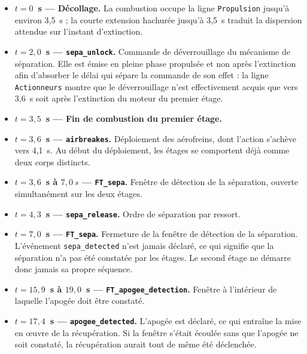 \begin{itemize}
    \item \textbf{$t = 0$~s — Décollage.} La combustion occupe la ligne \texttt{Propulsion} jusqu'à environ 3,5~s ; la courte
    extension hachurée jusqu'à 3,5~s traduit la dispersion attendue sur l'instant d'extinction.\\

    \item \textbf{$t = 2{,}0$~s — \texttt{sepa\_unlock}.} Commande de déverrouillage du mécanisme de séparation. Elle est
    émise en pleine phase propulsée et non après l'extinction afin d'absorber le délai qui sépare la commande de son effet : la
    ligne \texttt{Actionneurs} montre que le déverrouillage n'est effectivement acquis que vers 3,6~s soit après l'extinction du
    moteur du premier étage.\\

    \item \textbf{$t = 3{,}5$~s — Fin de combustion du premier étage.}\\

    \item \textbf{$t = 3{,}6$~s — \texttt{airbreakes}.} Déploiement des aérofreins, dont l'action s'achève vers 4,1~s. Au
    début du déploiement, les étages se comportent déjà comme deux corps distincts.\\  

    \item \textbf{$t = 3{,}6$~s à $7,0~s$ — \texttt{FT\_sepa}.} Fenêtre de détection de la séparation, ouverte simultanément
    sur les deux étages.\\

    \item \textbf{$t = 4{,}3$~s — \texttt{sepa\_release}.} Ordre de séparation par ressort.\\

    \item \textbf{$t = 7{,}0$~s — \texttt{FT\_sepa}.} Fermeture de la fenêtre de détection de la séparation. L'événement
    \texttt{sepa\_detected} n'est jamais déclaré, ce qui signifie que la séparation n'a pas été constatée par les étages. Le
    second étage ne démarre donc jamais sa propre séquence.\\

    \item \textbf{$t = 15{,}9$~s à $19,0$~s — \texttt{FT\_apogee\_detection}.} Fenêtre à l'intérieur de laquelle l'apogée
    doit être constaté.\\

    \item \textbf{$t = 17{,}4$~s — \texttt{apogee\_detected}.} L'apogée est déclaré, ce qui entraîne la mise en \oe uvre de
    la récupération. Si la fenêtre s'était écoulée sans que l'apogée ne soit constaté, la récupération aurait tout de même été
    déclenchée.
\end{itemize}

